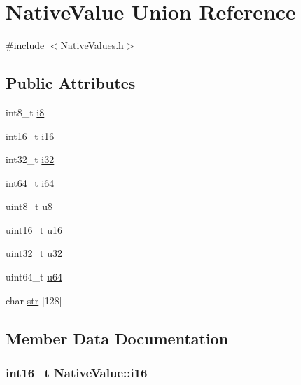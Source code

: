 \hypertarget{unionNativeValue}{}\section{Native\+Value Union Reference}
\label{unionNativeValue}


{\ttfamily \#include $<$Native\+Values.\+h$>$}

\subsection*{Public Attributes}
\begin{DoxyCompactItemize}
\item 
int8\+\_\+t \hyperlink{unionNativeValue_afa6c11e7310444fc54b52672f29b0851}{i8}
\item 
int16\+\_\+t \hyperlink{unionNativeValue_acf12bb9ab3bad9b103af275e5dbefe9d}{i16}
\item 
int32\+\_\+t \hyperlink{unionNativeValue_a4cbe7f42324173b29515dee236baf2c2}{i32}
\item 
int64\+\_\+t \hyperlink{unionNativeValue_ac0d957c8cb327ccf915b6de922fc8444}{i64}
\item 
uint8\+\_\+t \hyperlink{unionNativeValue_a828b63673532c2c53493f96453b3826f}{u8}
\item 
uint16\+\_\+t \hyperlink{unionNativeValue_ac8680bbb0804d550c485c942181490fe}{u16}
\item 
uint32\+\_\+t \hyperlink{unionNativeValue_adbe240086e05df57038bafbbe316a323}{u32}
\item 
uint64\+\_\+t \hyperlink{unionNativeValue_a4c6ef6c5f3ffdd7b7a662304bef89d4c}{u64}
\item 
char \hyperlink{unionNativeValue_adee38de50b0a6c4d36db7fbab7f8e526}{str} \mbox{[}128\mbox{]}
\end{DoxyCompactItemize}


\subsection{Member Data Documentation}
\hypertarget{unionNativeValue_acf12bb9ab3bad9b103af275e5dbefe9d}{}
\subsubsection[{i16}]{\setlength{\rightskip}{0pt plus 5cm}int16\+\_\+t Native\+Value\+::i16}\label{unionNativeValue_acf12bb9ab3bad9b103af275e5dbefe9d}
\hypertarget{unionNativeValue_a4cbe7f42324173b29515dee236baf2c2}{}
